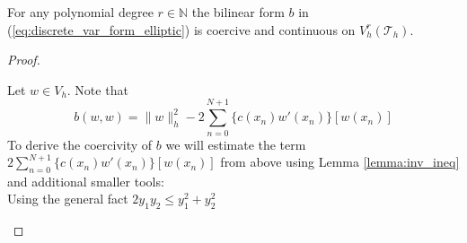\begin{theorem}
    For any polynomial degree $r\in \mathbb{N}$ the bilinear form $b$ in (\ref{eq:discrete_var_form_elliptic})
    is coercive and continuous on $V_h^r(\mathcal{T}_h)$.
\end{theorem}
\begin{proof}
    \begin{proofstep}[coercivity]
        Let $w\in V_h$. Note that 
        \begin{equation}
            b(w,w) = \|w\|_h^2 - 2\sum_{n=0}^{N+1}\{c(x_n)w'(x_n)\}[w(x_n)]
        \end{equation}
        To derive the coercivity of $b$ we will estimate the term $2\sum_{n=0}^{N+1}\{c(x_n)w'(x_n)\}[w(x_n)]$
        from above using Lemma \ref{lemma:inv_ineq} and additional smaller tools:\\
        Using the general fact $2y_1y_2 \leq y_1^2 + y_2^2$
    \end{proofstep}
\end{proof}



